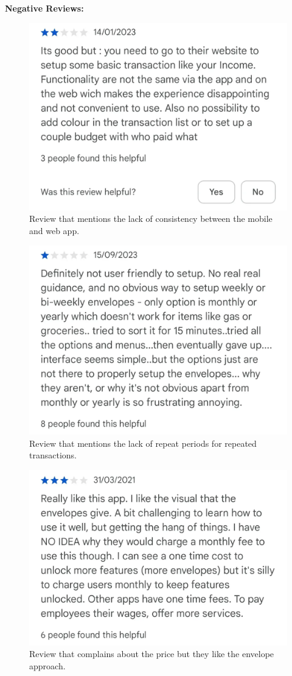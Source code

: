 \documentclass{l4proj}
\begin{document}
\begin{appendices}
\textbf{Negative Reviews:}
\begin{figure}[H]
    \centering
    \includegraphics[width=0.5\linewidth]{images/App-Comparison/goodbudget-neg-1.png}
    \caption{Review that mentions the lack of consistency between the mobile and web app.}
    \label{fig:enter-label}
\end{figure}
\begin{figure}[H]
    \centering
    \includegraphics[width=0.5\linewidth]{images/App-Comparison/goodbudget-neg-2.png}
    \caption{Review that mentions the lack of repeat periods for repeated transactions.}
    \label{fig:enter-label}
\end{figure}
\begin{figure}[H]
    \centering
    \includegraphics[width=0.5\linewidth]{images/App-Comparison/goodbudget-neg-3.png}
    \caption{Review that complains about the price but they like the envelope approach.}
    \label{fig:enter-label}
\end{figure}


\end{appendices}
\end{document}
